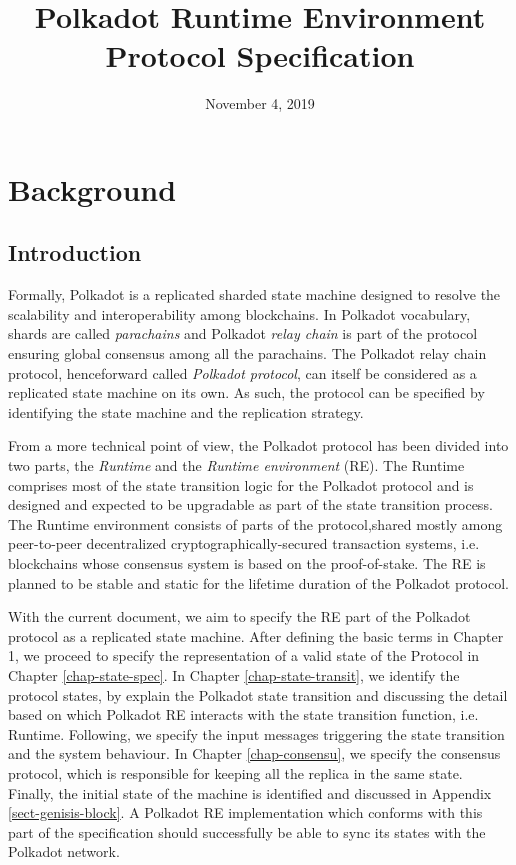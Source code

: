 \documentclass{book}
\newcommand{\tmem}[1]{{\em #1\/}}
\newcommand{\tmtextit}[1]{{\itshape{#1}}}
\providecommand{\tmem}[1]{\tmtextit{#1}}
\providecommand{\tmtextit}[1]{\tmtextit{#1}}
\begin{document}
\title{
  Polkadot Runtime Environment\\
  {\Large Protocol Specification}
}

\date{November 4, 2019}

\maketitle

{\tableofcontents}

\chapter{Background}

\section{Introduction}

Formally, Polkadot is a replicated sharded state machine designed to resolve
the scalability and interoperability among blockchains. In Polkadot
vocabulary, shards are called {\tmem{parachains}} and Polkadot {\tmem{relay
chain}} is part of the protocol ensuring global consensus among all the
parachains. The Polkadot relay chain protocol, henceforward called
{\tmem{Polkadot protocol}}, can itself be considered as a replicated state
machine on its own. As such, the protocol can be specified by identifying the
state machine and the replication strategy.

From a more technical point of view, the Polkadot protocol has been divided
into two parts, the {\tmem{Runtime}} and the {\tmem{Runtime environment}}
(RE). The Runtime comprises most of the state transition logic for the
Polkadot protocol and is designed and expected to be upgradable as part of the
state transition process. The Runtime environment consists of parts of the
protocol,\quad shared mostly among peer-to-peer decentralized
cryptographically-secured transaction systems, i.e. blockchains whose
consensus system is based on the proof-of-stake. The RE is planned to be
stable and static for the lifetime duration of the Polkadot protocol.

With the current document, we aim to specify the RE part of the Polkadot
protocol as a replicated state machine. After defining the basic terms in
Chapter 1, we proceed to specify the representation of a valid state of the
Protocol in Chapter \ref{chap-state-spec}. In Chapter
\ref{chap-state-transit}, we identify the protocol states, by explain the
Polkadot state transition and discussing the detail based on which Polkadot RE
interacts with the state transition function, i.e. Runtime. Following, we
specify the input messages triggering the state transition and the system
behaviour. In Chapter \ref{chap-consensu}, we specify the consensus protocol,
which is responsible for keeping all the replica in the same state. Finally,
the initial state of the machine is identified and discussed in Appendix
\ref{sect-genisis-block}. A Polkadot RE implementation which conforms with
this part of the specification should successfully be able to sync its states
with the Polkadot network.
\end{document}
